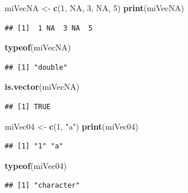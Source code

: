 \documentclass[
]{book}
\newenvironment{Shaded}{\begin{snugshade}}{\end{snugshade}}
\newcommand{\DecValTok}[1]{\textcolor[rgb]{0.00,0.00,0.81}{#1}}
\newcommand{\KeywordTok}[1]{\textcolor[rgb]{0.13,0.29,0.53}{\textbf{#1}}}
\newcommand{\NormalTok}[1]{#1}
\newcommand{\OtherTok}[1]{\textcolor[rgb]{0.56,0.35,0.01}{#1}}
\newcommand{\StringTok}[1]{\textcolor[rgb]{0.31,0.60,0.02}{#1}}
\begin{document}
\begin{Shaded}
\begin{Highlighting}[]
\NormalTok{miVecNA <-}\StringTok{ }\KeywordTok{c}\NormalTok{(}\DecValTok{1}\NormalTok{, }\OtherTok{NA}\NormalTok{, }\DecValTok{3}\NormalTok{, }\OtherTok{NA}\NormalTok{, }\DecValTok{5}\NormalTok{)}
\KeywordTok{print}\NormalTok{(miVecNA)}
\end{Highlighting}
\end{Shaded}

\begin{verbatim}
## [1]  1 NA  3 NA  5
\end{verbatim}

\begin{Shaded}
\begin{Highlighting}[]
\KeywordTok{typeof}\NormalTok{(miVecNA)}
\end{Highlighting}
\end{Shaded}

\begin{verbatim}
## [1] "double"
\end{verbatim}

\begin{Shaded}
\begin{Highlighting}[]
\KeywordTok{is.vector}\NormalTok{(miVecNA)}
\end{Highlighting}
\end{Shaded}

\begin{verbatim}
## [1] TRUE
\end{verbatim}

\begin{Shaded}
\begin{Highlighting}[]
\NormalTok{miVec04 <-}\StringTok{ }\KeywordTok{c}\NormalTok{(}\DecValTok{1}\NormalTok{, }\StringTok{"a"}\NormalTok{)}
\KeywordTok{print}\NormalTok{(miVec04)}
\end{Highlighting}
\end{Shaded}

\begin{verbatim}
## [1] "1" "a"
\end{verbatim}

\begin{Shaded}
\begin{Highlighting}[]
\KeywordTok{typeof}\NormalTok{(miVec04)}
\end{Highlighting}
\end{Shaded}

\begin{verbatim}
## [1] "character"
\end{verbatim}
\end{document}
